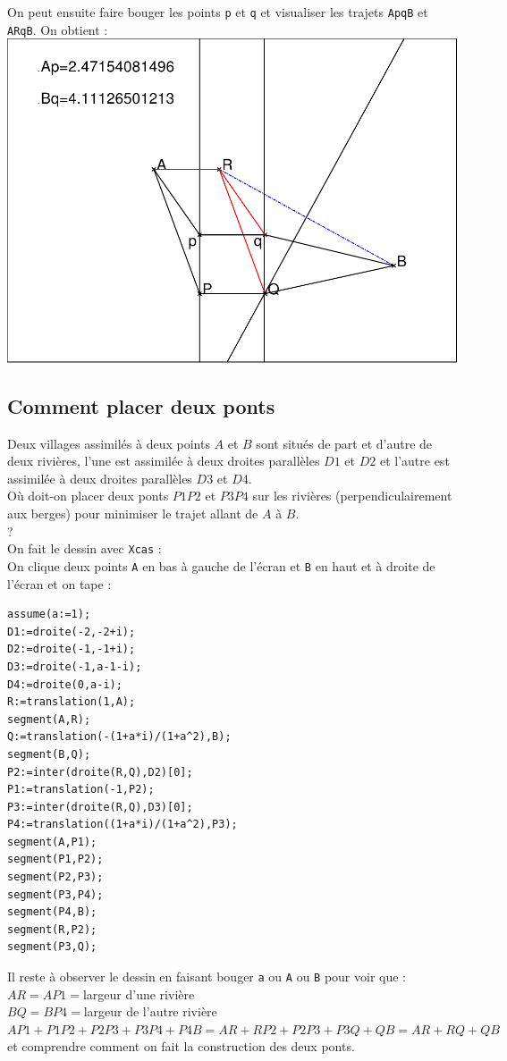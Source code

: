 \documentclass[a4paper,11pt]{book}
\begin{document}
On peut ensuite faire bouger les points {\tt p} et {\tt q} et visualiser les 
trajets {\tt ApqB} et {\tt ARqB}.  
On obtient :\\
\includegraphics[width=\textwidth]{pont3}
\subsection{Comment placer deux ponts}
Deux villages assimil\'es \`a deux points $A$ et $B$ sont situ\'es de part et 
d'autre de deux rivi\`eres, l'une est  assimil\'ee \`a deux droites 
parall\`eles $D1$ et $D2$ et l'autre est  assimil\'ee \`a deux droites 
parall\`eles $D3$ et $D4$.\\
O\`u doit-on placer deux ponts $P1P2$ et $P3P4$  sur les rivi\`eres 
(perpendiculairement aux berges) pour minimiser le trajet allant de $A$ \`a 
$B$.\\ ?\\
On fait le dessin avec {\tt Xcas} :\\
On clique deux points {\tt A} en bas \`a gauche  de l'\'ecran et {\tt B} 
en haut et \`a droite de l'\'ecran et on tape :\\
\begin{verbatim}
assume(a:=1);
D1:=droite(-2,-2+i);
D2:=droite(-1,-1+i);
D3:=droite(-1,a-1-i);
D4:=droite(0,a-i);
R:=translation(1,A);
segment(A,R);
Q:=translation(-(1+a*i)/(1+a^2),B);
segment(B,Q);
P2:=inter(droite(R,Q),D2)[0];
P1:=translation(-1,P2);
P3:=inter(droite(R,Q),D3)[0];
P4:=translation((1+a*i)/(1+a^2),P3);
segment(A,P1);
segment(P1,P2);
segment(P2,P3);
segment(P3,P4);
segment(P4,B);
segment(R,P2);
segment(P3,Q);
\end{verbatim}
Il reste \`a observer le dessin en faisant bouger {\tt a} ou {\tt A}
ou {\tt B} pour voir que :\\
$AR=AP1=$largeur d'une rivi\`ere\\
$BQ=BP4=$largeur de l'autre rivi\`ere\\
$AP1+P1P2+P2P3+P3P4+P4B=AR+RP2+P2P3+P3Q+QB=AR+RQ+QB$\\
 et comprendre comment on fait la construction des deux ponts. 
\end{document}
